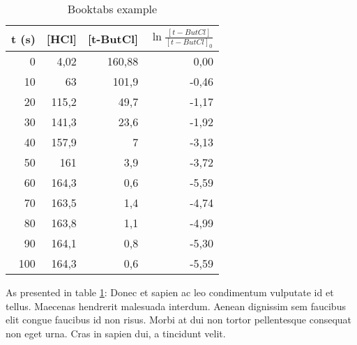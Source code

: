\begin{table}[htbp]
  \centering
  \caption{Booktabs example}
  \vspace{-16.5pt}
    \begin{tabular}{rrrr}
    \toprule
    t (s) & [HCl] & [t-ButCl] & $\ln\frac{[t-ButCl]}{[t-ButCl]_0}$ \\
    \midrule
    0     & 4,02  & 160,88 & 0,00 \\
    10    & 63    & 101,9 & -0,46 \\
    20    & 115,2 & 49,7  & -1,17 \\
    30    & 141,3 & 23,6  & -1,92 \\
    40    & 157,9 & 7     & -3,13 \\
    50    & 161   & 3,9   & -3,72 \\
    60    & 164,3 & 0,6   & -5,59 \\
    70    & 163,5 & 1,4   & -4,74 \\
    80    & 163,8 & 1,1   & -4,99 \\
    90    & 164,1 & 0,8   & -5,30 \\
    100   & 164,3 & 0,6   & -5,59 \\
    \bottomrule
    \end{tabular}
  \label{tab:thisislabel}
\end{table}

As presented in table \ref{tab:thisislabel}: Donec et sapien ac leo condimentum vulputate id et tellus. Maecenas hendrerit malesuada interdum. Aenean dignissim sem faucibus elit congue faucibus id non risus. Morbi at dui non tortor pellentesque consequat non eget urna. Cras in sapien dui, a tincidunt velit.
